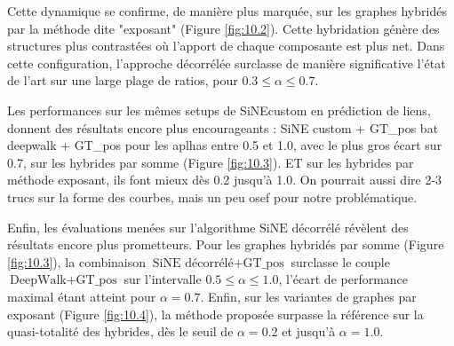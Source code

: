 Cette dynamique se confirme, de manière plus marquée, sur les graphes hybridés par la méthode dite "exposant" (Figure \ref{fig:10.2}). Cette hybridation génère des structures plus contrastées où l'apport de chaque composante est plus net. Dans cette configuration, l'approche décorrélée surclasse de manière significative l'état de l'art sur une large plage de ratios, pour $0.3 \le \alpha \le 0.7$.

Les performances sur les mêmes setups de SiNEcustom en prédiction de liens, donnent des résultats encore plus encourageants : SiNE custom + GT\_pos bat deepwalk + GT\_pos pour les aplhas entre 0.5 et 1.0, avec le plus gros écart sur 0.7, sur les hybrides par somme (Figure \ref{fig:10.3}). ET sur les hybrides par méthode exposant, ils font mieux dès 0.2 jusqu'à 1.0. On pourrait aussi dire 2-3 trucs sur la forme des courbes, mais un peu osef pour notre problématique.


Enfin, les évaluations menées sur l'algorithme $\text{SiNE}$ décorrélé révèlent des résultats encore plus prometteurs. Pour les graphes hybridés par somme (Figure \ref{fig:10.3}), la combinaison $\text{SiNE décorrélé} + \text{GT\_pos}$ surclasse le couple $\text{DeepWalk} + \text{GT\_pos}$ sur l'intervalle $0.5 \le \alpha \le 1.0$, l'écart de performance maximal étant atteint pour $\alpha = 0.7$. Enfin, sur les variantes de graphes par exposant (Figure \ref{fig:10.4}), la méthode proposée surpasse la référence sur la quasi-totalité des hybrides, dès le seuil de $\alpha = 0.2$ et jusqu'à $\alpha = 1.0$.


